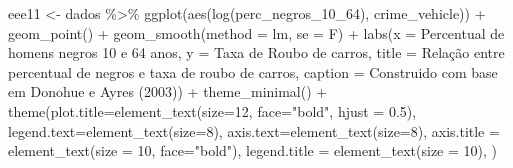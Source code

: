 \documentclass[
]{article}
\newenvironment{Shaded}{\begin{snugshade}}{\end{snugshade}}
\newcommand{\AttributeTok}[1]{\textcolor[rgb]{0.77,0.63,0.00}{#1}}
\newcommand{\DecValTok}[1]{\textcolor[rgb]{0.00,0.00,0.81}{#1}}
\newcommand{\FloatTok}[1]{\textcolor[rgb]{0.00,0.00,0.81}{#1}}
\newcommand{\FunctionTok}[1]{\textcolor[rgb]{0.00,0.00,0.00}{#1}}
\newcommand{\NormalTok}[1]{#1}
\newcommand{\OtherTok}[1]{\textcolor[rgb]{0.56,0.35,0.01}{#1}}
\newcommand{\SpecialCharTok}[1]{\textcolor[rgb]{0.00,0.00,0.00}{#1}}
\newcommand{\StringTok}[1]{\textcolor[rgb]{0.31,0.60,0.02}{#1}}
\begin{document}
\begin{Shaded}
\begin{Highlighting}[]
\NormalTok{eee11 }\OtherTok{\textless{}{-}}\NormalTok{ dados }\SpecialCharTok{\%\textgreater{}\%} 
  \FunctionTok{ggplot}\NormalTok{(}\FunctionTok{aes}\NormalTok{(}\FunctionTok{log}\NormalTok{(perc\_negros\_10\_64), crime\_vehicle)) }\SpecialCharTok{+}
  \FunctionTok{geom\_point}\NormalTok{() }\SpecialCharTok{+} 
  \FunctionTok{geom\_smooth}\NormalTok{(}\AttributeTok{method =} \StringTok{\textquotesingle{}lm\textquotesingle{}}\NormalTok{, }\AttributeTok{se =}\NormalTok{ F) }\SpecialCharTok{+}
  \FunctionTok{labs}\NormalTok{(}\AttributeTok{x =} \StringTok{\textquotesingle{}Percentual de homens negros 10 e 64 anos\textquotesingle{}}\NormalTok{,}
       \AttributeTok{y =} \StringTok{\textquotesingle{}Taxa de Roubo de carros\textquotesingle{}}\NormalTok{,}
       \AttributeTok{title =} \StringTok{\textquotesingle{}Relação entre percentual de negros e taxa de roubo de carros\textquotesingle{}}\NormalTok{,}
       \AttributeTok{caption =} \StringTok{\textquotesingle{}Construido com base em Donohue e Ayres (2003)\textquotesingle{}}\NormalTok{) }\SpecialCharTok{+} 
  \FunctionTok{theme\_minimal}\NormalTok{() }\SpecialCharTok{+}
  \FunctionTok{theme}\NormalTok{(}\AttributeTok{plot.title=}\FunctionTok{element\_text}\NormalTok{(}\AttributeTok{size=}\DecValTok{12}\NormalTok{, }\AttributeTok{face=}\StringTok{"bold"}\NormalTok{, }\AttributeTok{hjust =} \FloatTok{0.5}\NormalTok{),}
        \AttributeTok{legend.text=}\FunctionTok{element\_text}\NormalTok{(}\AttributeTok{size=}\DecValTok{8}\NormalTok{),}
        \AttributeTok{axis.text=}\FunctionTok{element\_text}\NormalTok{(}\AttributeTok{size=}\DecValTok{8}\NormalTok{),}
        \AttributeTok{axis.title =} \FunctionTok{element\_text}\NormalTok{(}\AttributeTok{size =} \DecValTok{10}\NormalTok{, }\AttributeTok{face=}\StringTok{"bold"}\NormalTok{),}
        \AttributeTok{legend.title =} \FunctionTok{element\_text}\NormalTok{(}\AttributeTok{size =} \DecValTok{10}\NormalTok{),}
\NormalTok{        )}


\end{Highlighting}
\end{Shaded}
\end{document}
